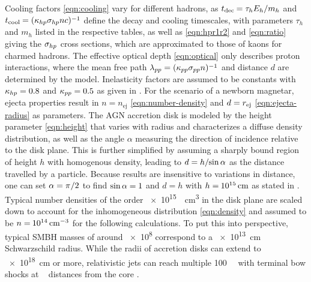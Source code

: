 Cooling factors \eqref{eqn:cooling} vary for different hadrons, as $t_\text{dec} \kern-0.5pt = \tau_h E_h / m_h$ and
$t_\text{cool} \kern-0.5pt = \cramped{(\kappa_{h \kern-0.1pt p} \sigma_{h \kern-0.1pt p} n c)^{-1}}$ define the decay and cooling timescales,
with parameters $\tau_h$ and $m_h$ listed in the respective tables, as well as \eqref{eqn:hpr1r2} and \eqref{eqn:ratio} giving the
$\sigma_{h \kern-0.1pt p}$ cross sections, which are approximated to those of kaons for charmed hadrons. The effective optical depth
\eqref{eqn:optical} only describes proton interactions, where the mean free path
$\lambda_{p \kern-0.1pt p} = \cramped{(\kappa_{p \kern-0.1pt p} \sigma_{p \kern-0.1pt p} n)^{-1}}$ and distance $d$ are determined by the
model. Inelasticity factors are assumed to be constants with $\kappa_{h \kern-0.1pt p} = \num{0.8}$ and $\kappa_{p \kern-0.1pt p} = \num{0.5}$
as given in \cite{Carpio_2020}. For the scenario of a newborn magnetar, ejecta properties result in
$n = n_\text{ej}$ \eqref{eqn:number-density} and $d \kern+0.1pt = r_\text{ej}$ \eqref{eqn:ejecta-radius} as parameters. The AGN
accretion disk is modeled by the height parameter \eqref{eqn:height} that varies with radius and characterizes a diffuse density
distribution, as well as the angle $\alpha$ measuring the direction of incidence relative to the disk plane. This is further
simplified by assuming a sharply bound region of height $h$ with homogenous density, leading to $d = h / \kern-2.0pt \sin \alpha$
as the distance travelled by a particle. Because results are insensitive to variations in distance, one can set
$\alpha = \pi \kern+0.25pt / 2$ to find $\sin\alpha = \kern-0.1pt 1$ and $d = h$ with $h = \kern-0.5pt \smash{\qty{e15}{\centi\meter}}$
as stated in \cite{King_2008}. Typical number densities of the order \qty{e15}{\per\centi\meter\cubed} in the disk plane
\cite{Garcia_2013, Garcia_2014} are scaled down to account for the inhomogeneous distribution \eqref{eqn:density} and assumed to be
$n = \kern-0.5pt \smash{\qty{e14}{\per\centi\meter\cubed}}$ for the following calculations. To put this into perspective, typical
SMBH masses of around \qty{e8}{\solarmass} correspond to a \qty{e13}{\centi\meter} Schwarzschild radius. While the radii of accretion disks
can extend to \qty{e18}{\centi\meter} or more, relativistic jets can reach multiple \qty{100}{\kilo\parsec} with terminal bow shocks at
\unit{\mega\parsec} distances from the core \cite{Blandford_2019, King_2008, Murase_2023}.

\newpage

